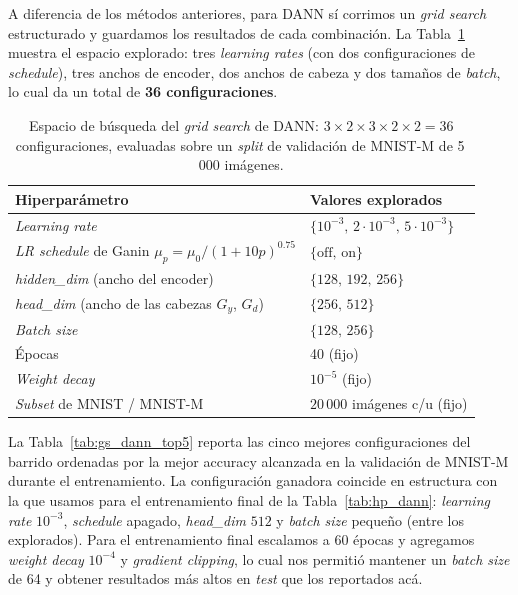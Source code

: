 \documentclass[12pt]{article}
\begin{document}
A diferencia de los métodos anteriores, para DANN sí corrimos un \textit{grid search} estructurado y guardamos los resultados de cada combinación. La Tabla~\ref{tab:gs_dann} muestra el espacio explorado: tres \textit{learning rates} (con dos configuraciones de \textit{schedule}), tres anchos de encoder, dos anchos de cabeza y dos tamaños de \textit{batch}, lo cual da un total de \textbf{36 configuraciones}.

\begin{table}[H]
    \centering
    \begin{tabular}{ll}
        \hline
        Hiperparámetro                       & Valores explorados \\
        \hline
        \textit{Learning rate}               & $\{10^{-3},\, 2\cdot 10^{-3},\, 5\cdot 10^{-3}\}$ \\
        \textit{LR schedule} de Ganin $\mu_p = \mu_0/(1+10p)^{0.75}$ & $\{\text{off},\, \text{on}\}$ \\
        \textit{hidden\_dim} (ancho del encoder) & $\{128,\, 192,\, 256\}$ \\
        \textit{head\_dim} (ancho de las cabezas $G_y$, $G_d$) & $\{256,\, 512\}$ \\
        \textit{Batch size}                  & $\{128,\, 256\}$ \\
        Épocas                               & 40 (fijo) \\
        \textit{Weight decay}                & $10^{-5}$ (fijo) \\
        \textit{Subset} de MNIST / MNIST-M   & $20\,000$ imágenes c/u (fijo) \\
        \hline
    \end{tabular}
    \caption{Espacio de búsqueda del \textit{grid search} de DANN: $3 \times 2 \times 3 \times 2 \times 2 = 36$ configuraciones, evaluadas sobre un \textit{split} de validación de MNIST-M de 5\,000 imágenes.}
    \label{tab:gs_dann}
\end{table}

La Tabla~\ref{tab:gs_dann_top5} reporta las cinco mejores configuraciones del barrido ordenadas por la mejor accuracy alcanzada en la validación de MNIST-M durante el entrenamiento. La configuración ganadora coincide en estructura con la que usamos para el entrenamiento final de la Tabla~\ref{tab:hp_dann}: \textit{learning rate} $10^{-3}$, \textit{schedule} apagado, \textit{head\_dim} $512$ y \textit{batch size} pequeño (entre los explorados). Para el entrenamiento final escalamos a 60 épocas y agregamos \textit{weight decay} $10^{-4}$ y \textit{gradient clipping}, lo cual nos permitió mantener un \textit{batch size} de 64 y obtener resultados más altos en \textit{test} que los reportados acá.
\end{document}
